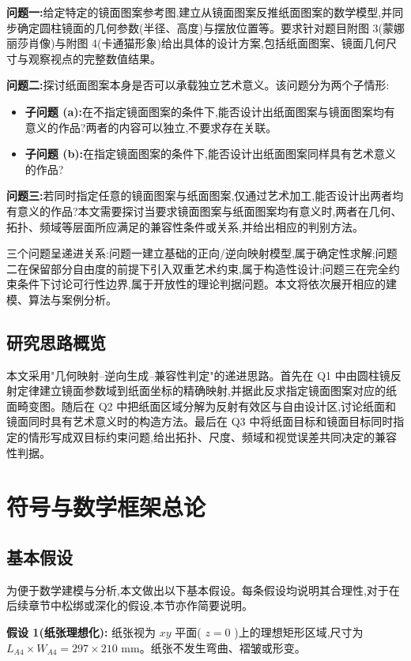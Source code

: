 \documentclass[12pt, a4paper]{ctexart}
\begin{document}
\textbf{问题一:}给定特定的镜面图案参考图,建立从镜面图案反推纸面图案的数学模型,并同步确定圆柱镜面的几何参数(半径、高度)与摆放位置等。要求针对题目附图 3(蒙娜丽莎肖像)与附图 4(卡通猫形象)给出具体的设计方案,包括纸面图案、镜面几何尺寸与观察视点的完整数值结果。

\textbf{问题二:}探讨纸面图案本身是否可以承载独立艺术意义。该问题分为两个子情形:
\begin{itemize}
    \item \textbf{子问题 (a):}在不指定镜面图案的条件下,能否设计出纸面图案与镜面图案均有意义的作品?两者的内容可以独立,不要求存在关联。
    \item \textbf{子问题 (b):}在指定镜面图案的条件下,能否设计出纸面图案同样具有艺术意义的作品?
\end{itemize}

\textbf{问题三:}若同时指定任意的镜面图案与纸面图案,仅通过艺术加工,能否设计出两者均有意义的作品?本文需要探讨当要求镜面图案与纸面图案均有意义时,两者在几何、拓扑、频域等层面所应满足的兼容性条件或关系,并给出相应的判别方法。

三个问题呈递进关系:问题一建立基础的正向/逆向映射模型,属于确定性求解;问题二在保留部分自由度的前提下引入双重艺术约束,属于构造性设计;问题三在完全约束条件下讨论可行性边界,属于开放性的理论判据问题。本文将依次展开相应的建模、算法与案例分析。

\subsection{研究思路概览}
本文采用"几何映射--逆向生成--兼容性判定"的递进思路。首先在 Q1 中由圆柱镜反射定律建立镜面参数域到纸面坐标的精确映射,并据此反求指定镜面图案对应的纸面畸变图。随后在 Q2 中把纸面区域分解为反射有效区与自由设计区,讨论纸面和镜面同时具有艺术意义时的构造方法。最后在 Q3 中将纸面目标和镜面目标同时指定的情形写成双目标约束问题,给出拓扑、尺度、频域和视觉误差共同决定的兼容性判据。


\section{符号与数学框架总论}
\subsection{基本假设}

为便于数学建模与分析,本文做出以下基本假设。每条假设均说明其合理性,对于在后续章节中松绑或深化的假设,本节亦作简要说明。

\textbf{假设 1(纸张理想化):} 纸张视为 $xy$ 平面( $z=0$ )上的理想矩形区域,尺寸为 $L_{A4} \times W_{A4} = 297 \times 210$ mm。纸张不发生弯曲、褶皱或形变。
\end{document}

